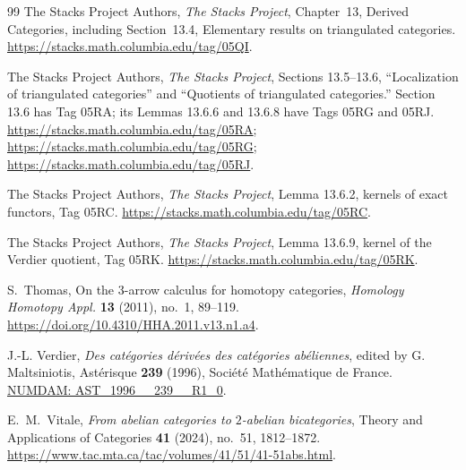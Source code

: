 \documentclass[11pt,reqno,a4paper]{amsart}
\theoremstyle{definition}
\theoremstyle{remark}
\newcommand{\0}{\mathbf{0}}
\renewcommand{\1}{\mathbf{1}}
\begin{document}
\begin{thebibliography}{99}
The Stacks Project Authors,
\emph{The Stacks Project}, Chapter~13, Derived Categories,
including Section~13.4, Elementary results on triangulated categories.
\url{https://stacks.math.columbia.edu/tag/05QI}.

The Stacks Project Authors,
\emph{The Stacks Project}, Sections 13.5--13.6,
``Localization of triangulated categories'' and
``Quotients of triangulated categories.''
Section 13.6 has Tag 05RA; its Lemmas 13.6.6 and 13.6.8 have
Tags 05RG and 05RJ.
\url{https://stacks.math.columbia.edu/tag/05RA};
\url{https://stacks.math.columbia.edu/tag/05RG};
\url{https://stacks.math.columbia.edu/tag/05RJ}.

The Stacks Project Authors,
\emph{The Stacks Project}, Lemma 13.6.2,
kernels of exact functors, Tag 05RC.
\url{https://stacks.math.columbia.edu/tag/05RC}.

The Stacks Project Authors,
\emph{The Stacks Project}, Lemma 13.6.9,
kernel of the Verdier quotient, Tag 05RK.
\url{https://stacks.math.columbia.edu/tag/05RK}.

S.~Thomas,
On the 3-arrow calculus for homotopy categories,
\emph{Homology Homotopy Appl.} \textbf{13} (2011), no.~1, 89--119.
\newline\url{https://doi.org/10.4310/HHA.2011.v13.n1.a4}.

J.-L. Verdier,
\emph{Des cat\'egories d\'eriv\'ees des cat\'egories ab\'eliennes},
edited by G. Maltsiniotis, Ast\'erisque \textbf{239} (1996),
Soci\'et\'e Math\'ematique de France.
\href{https://www.numdam.org/item/AST_1996__239__R1_0/}{NUMDAM: AST\_1996\_\_239\_\_R1\_0}.

E.~M.~Vitale,
\emph{From abelian categories to $2$-abelian bicategories},
Theory and Applications of Categories \textbf{41} (2024),
no.~51, 1812--1872.
\url{https://www.tac.mta.ca/tac/volumes/41/51/41-51abs.html}.

\end{thebibliography}
\end{document}
